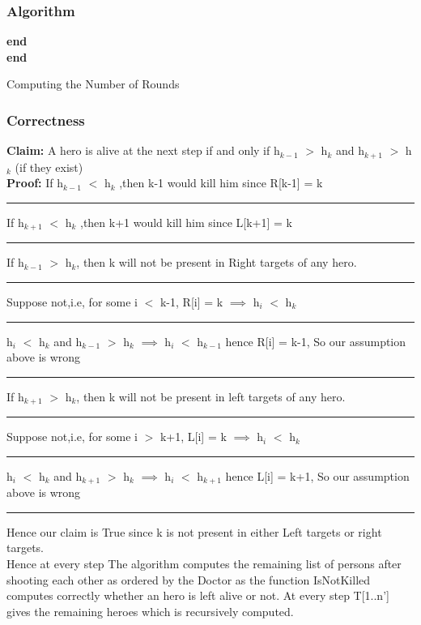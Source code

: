 \documentclass{report}
\begin{document}
 \subsubsection{Algorithm}
 \begin{algorithm}[H]
\SetAlgoLined
\DontPrintSemicolon
    \textbf{end}\\
\textbf{end}
\caption{Computing the Number of Rounds}
\end{algorithm}
 \subsubsection{Correctness}
 \textbf{Claim:} A hero is alive at the next step if and only if h$_{k-1}$ $>$ h$_k$ and h$_{k+1}$ $>$ h$_k$ (if they exist)\\ 
 \textbf{Proof:} If h$_{k-1}$ $<$ h$_k$ ,then k-1 would kill him since R[k-1] = k\\
 \rule[0.5mm]{1cm}{0pt} If h$_{k+1}$ $<$ h$_k$ ,then k+1 would kill him since L[k+1] = k\\
 \rule[0.5mm]{1cm}{0pt} If h$_{k-1}$ $>$ h$_k$, then k will not be present in Right targets of any hero.\\
 \rule[0.5mm]{1cm}{0pt} Suppose not,i.e, for some i $<$ k-1, R[i] = k $\implies$ h$_i$ $<$ h$_k$\\
 \rule[0.5mm]{1cm}{0pt} h$_i$ $<$ h$_k$ and h$_{k-1}$ $>$ h$_k$ $\implies$ h$_i$ $<$ h$_{k-1}$ hence R[i] = k-1, So our assumption above is wrong\\
 \rule[0.5mm]{1cm}{0pt} If h$_{k+1}$ $>$ h$_k$, then k will not be present in left targets of any hero.\\
 \rule[0.5mm]{1cm}{0pt} Suppose not,i.e, for some i $>$ k+1, L[i] = k $\implies$ h$_i$ $<$ h$_k$\\
 \rule[0.5mm]{1cm}{0pt} h$_i$ $<$ h$_k$ and h$_{k+1}$ $>$ h$_k$ $\implies$ h$_i$ $<$ h$_{k+1}$ hence L[i] = k+1, So our assumption above is wrong\\
 \rule[0.5mm]{1cm}{0pt} Hence our claim is True since k is not present in either Left targets or right targets.\\
 Hence at every step The algorithm computes the remaining list of persons after shooting each other as ordered by the Doctor as the function IsNotKilled computes correctly whether an hero is left alive or not. At every step T[1..n'] gives the remaining heroes which is recursively computed.
\end{document}
